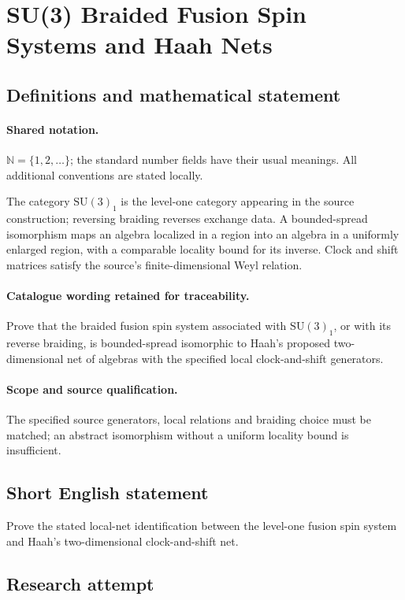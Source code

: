 \documentclass[11pt]{article}
\begin{document}
\section{SU(3) Braided Fusion Spin Systems and Haah Nets}\label{statement}

\subsection{Definitions and mathematical statement}

\paragraph{Shared notation.}$\mathbb N=\{1,2,\ldots\}$; the standard number fields have their usual meanings. All additional conventions are stated locally.


The category $\mathrm{SU}(3)_1$ is the level-one category appearing in the source construction; reversing braiding reverses exchange data. A bounded-spread isomorphism maps an algebra localized in a region into an algebra in a uniformly enlarged region, with a comparable locality bound for its inverse. Clock and shift matrices satisfy the source's finite-dimensional Weyl relation.

\paragraph{Catalogue wording retained for traceability.}
Prove that the braided fusion spin system associated with $\mathrm{SU}(3)_1$, or with its reverse braiding, is bounded-spread isomorphic to Haah's proposed two-dimensional net of algebras with the specified local clock-and-shift generators.

\paragraph{Scope and source qualification.}The specified source generators, local relations and braiding choice must be matched; an abstract isomorphism without a uniform locality bound is insufficient.
\subsection{Short English statement}
Prove the stated local-net identification between the level-one fusion spin system and Haah's two-dimensional clock-and-shift net.
\subsection{Research attempt}
\end{document}
